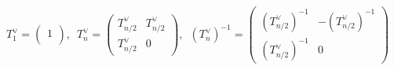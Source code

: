 $$ T_1^{\lor} = \begin{pmatrix}
1 \\
\end{pmatrix}, \, \, \, T_n^{\lor} = \begin{pmatrix}
    T_{n/2}^{\lor} & T_{n/2}^{\lor} \\
T_{n/2}^{\lor} & 0
\end{pmatrix}, \, \, \, \left(T_n^{\lor}\right)^{-1} = \begin{pmatrix}
\left(T_{n/2}^{\lor}\right)^{-1} & -\left(T_{n/2}^{\lor}\right)^{-1} \\
\left(T_{n/2}^{\lor} \right)^{-1} & 0
\end{pmatrix}
$$



